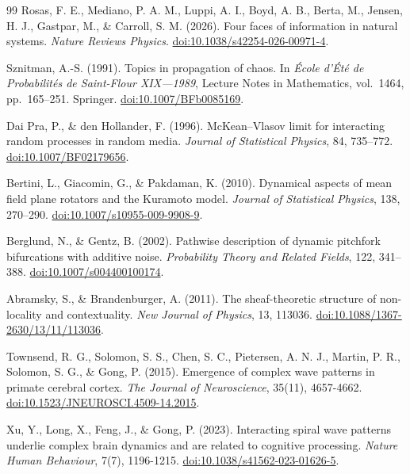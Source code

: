 \begin{thebibliography}{99}
  Rosas, F. E., Mediano, P. A. M., Luppi, A. I., Boyd, A. B., Berta, M., Jensen, H. J., Gastpar, M., \& Carroll, S. M. (2026). Four faces of information in natural systems. \textit{Nature Reviews Physics}. \href{https://doi.org/10.1038/s42254-026-00971-4}{doi:10.1038/s42254-026-00971-4}.

  Sznitman, A.-S. (1991). Topics in propagation of chaos. In \textit{\'Ecole d'\'Et\'e de Probabilit\'es de Saint-Flour XIX---1989}, Lecture Notes in Mathematics, vol.~1464, pp.~165--251. Springer. \href{https://doi.org/10.1007/BFb0085169}{doi:10.1007/BFb0085169}.

 Dai Pra, P., \& den Hollander, F. (1996). McKean--Vlasov limit for interacting random processes in random media. \textit{Journal of Statistical Physics}, 84, 735--772. \href{https://doi.org/10.1007/BF02179656}{doi:10.1007/BF02179656}.

 Bertini, L., Giacomin, G., \& Pakdaman, K. (2010). Dynamical aspects of mean field plane rotators and the Kuramoto model. \textit{Journal of Statistical Physics}, 138, 270--290. \href{https://doi.org/10.1007/s10955-009-9908-9}{doi:10.1007/s10955-009-9908-9}.

  Berglund, N., \& Gentz, B. (2002). Pathwise description of dynamic pitchfork bifurcations with additive noise. \textit{Probability Theory and Related Fields}, 122, 341--388. \href{https://doi.org/10.1007/s004400100174}{doi:10.1007/s004400100174}.

  Abramsky, S., \& Brandenburger, A. (2011). The sheaf-theoretic structure of non-locality and contextuality. \textit{New Journal of Physics}, 13, 113036. \href{https://doi.org/10.1088/1367-2630/13/11/113036}{doi:10.1088/1367-2630/13/11/113036}.

 Townsend, R. G., Solomon, S. S., Chen, S. C., Pietersen, A. N. J., Martin, P. R., Solomon, S. G., \& Gong, P. (2015). Emergence of complex wave patterns in primate cerebral cortex. \textit{The Journal of Neuroscience}, 35(11), 4657-4662. \href{https://doi.org/10.1523/JNEUROSCI.4509-14.2015}{doi:10.1523/JNEUROSCI.4509-14.2015}.

 Xu, Y., Long, X., Feng, J., \& Gong, P. (2023). Interacting spiral wave patterns underlie complex brain dynamics and are related to cognitive processing. \textit{Nature Human Behaviour}, 7(7), 1196-1215. \href{https://doi.org/10.1038/s41562-023-01626-5}{doi:10.1038/s41562-023-01626-5}.


\end{thebibliography}
